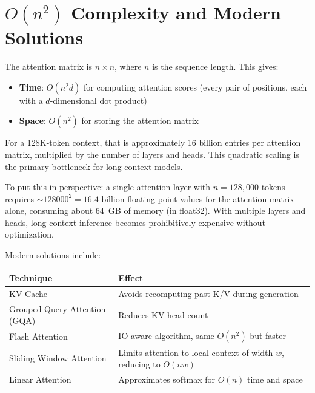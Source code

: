 \section{\texorpdfstring{$O(n^2)$}{O(n²)} Complexity and Modern Solutions}

The attention matrix is $n \times n$, where $n$ is the sequence length. This
gives:
\begin{itemize}
  \item \textbf{Time}: $O(n^2 d)$ for computing attention scores (every pair of
        positions, each with a $d$-dimensional dot product)
  \item \textbf{Space}: $O(n^2)$ for storing the attention matrix
\end{itemize}

For a 128K-token context, that is approximately 16 billion entries per attention
matrix, multiplied by the number of layers and heads. This quadratic scaling is
the primary bottleneck for long-context models.

To put this in perspective: a single attention layer with $n = 128{,}000$ tokens
requires $\sim\!128000^2 = 16.4$ billion floating-point values for the attention
matrix alone, consuming about 64~GB of memory (in float32). With multiple layers
and heads, long-context inference becomes prohibitively expensive without
optimization.

Modern solutions include:

\begin{center}
\begin{tabular}{ll}
\toprule
\textbf{Technique} & \textbf{Effect} \\
\midrule
KV Cache & Avoids recomputing past K/V during generation \\
Grouped Query Attention (GQA) & Reduces KV head count \\
Flash Attention & IO-aware algorithm, same $O(n^2)$ but faster \\
Sliding Window Attention & Limits attention to local context of width $w$, reducing to $O(nw)$ \\
Linear Attention & Approximates softmax for $O(n)$ time and space \\
\bottomrule
\end{tabular}
\end{center}

